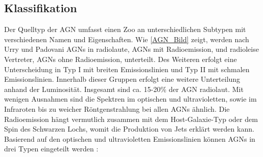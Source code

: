\subsection{Klassifikation}
\label{subsec:Klassifikation}
Der Quelltyp der AGN umfasst einen Zoo an unterschiedlichen Subtypen mit verschiedenen Namen und Eigenschaften.
Wie \autoref{AGN_Bild} zeigt, werden nach Urry und Padovani \cite{Urry_Padovani} AGNs in radiolaute, AGNs mit Radioemission, und radioleise Vertreter, AGNs ohne Radioemission, unterteilt.
Des Weiteren erfolgt eine Unterscheidung in Typ I mit breiten Emissionslinien und Typ II mit schmalen Emissionslinien.
Innerhalb dieser Gruppen erfolgt eine weitere Unterteilung anhand der Luminosität.
Insgesamt sind ca. 15-20\% \cite{Urry_Padovani} der AGN radiolaut.
Mit wenigen Ausnahmen sind die Spektren im optischen und ultravioletten, sowie im Infraroten bis zu weicher Röntgenstrahlung bei allen AGNs ähnlich.
Die Radioemission hängt vermutlich zusammen mit dem Host-Galaxie-Typ oder dem Spin des Schwarzen Lochs, womit die Produktion von Jets erklärt werden kann.
Basierend auf den optischen und ultravioletten Emissionslinien können AGNs in drei Typen eingeteilt werden \cite{Urry_Padovani}:

